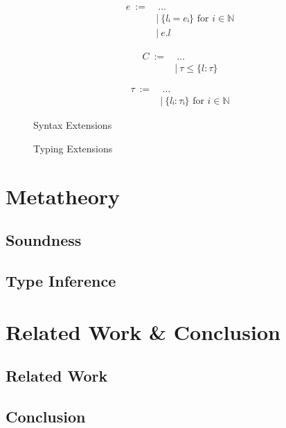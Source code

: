 \documentclass[runningheads]{llncs}
\begin{document}
\begin{figure}[t]
  \begin{subfigure}[t]{0.3\textwidth}
    \begin{align*}
      e \ := & \ \dots                            \\
             & | \ \{lᵢ = eᵢ\} \text{ for } i ∈ ℕ \\
             & | \ e.l
    \end{align*}
  \end{subfigure}
  \begin{subfigure}[t]{0.3\textwidth}
    \begin{align*}
      C \ := & \ \dots            \\
             & | \ τ ≤ \{l : τ\}
    \end{align*}
  \end{subfigure}
  \begin{subfigure}[t]{0.3\textwidth}
    \begin{align*}
      τ \ := & \ \dots                            \\
             & | \ \{lᵢ : τᵢ\} \text{ for } i ∈ ℕ
    \end{align*}
  \end{subfigure}
  \centering
  \caption{Syntax Extensions}
\end{figure}
\begin{figure}[t]
  
  \centering
  \caption{Typing Extensions}
\end{figure}


\section{Metatheory}
\subsection{Soundness}
\subsection{Type Inference}
\section{Related Work \& Conclusion}
\subsection{Related Work}
\subsection{Conclusion}
\nocite{sts}
\nocite{atapl}
\printbibliography{}
\end{document}
